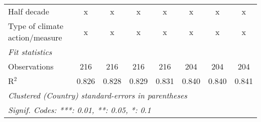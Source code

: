 \begin{tabular}{lccccccc}
   Half decade                                                                            & x              & x             & x              & x             & x             & x             & x\\  
   Type of climate action/measure                                                         & x              & x             & x              & x             & x             & x             & x\\  
   \midrule \emph{Fit statistics}\\
   Observations                                                                           & 216            & 216           & 216            & 216           & 204           & 204           & 204\\  
   R$^2$                                                                                  & 0.826          & 0.828         & 0.829          & 0.831         & 0.840         & 0.840         & 0.841\\  
   \midrule
   \multicolumn{8}{l}{\emph{Clustered (Country) standard-errors in parentheses}}\\
   \multicolumn{8}{l}{\emph{Signif. Codes: ***: 0.01, **: 0.05, *: 0.1}}\\
\end{tabular}
\par\endgroup


